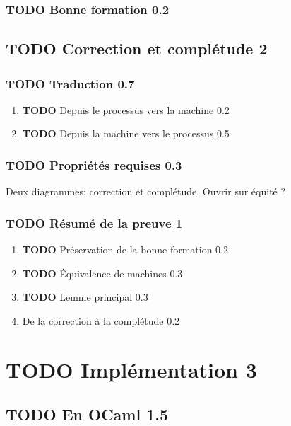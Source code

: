 \documentclass[11pt]{article}
\begin{document}
\subsubsection{{\bfseries\sffamily TODO} Bonne formation 0.2}
\label{sec-3-1-3}
\subsection{{\bfseries\sffamily TODO} Correction et complétude 2}
\label{sec-3-2}
\subsubsection{{\bfseries\sffamily TODO} Traduction 0.7}
\label{sec-3-2-1}
\begin{enumerate}
\item {\bfseries\sffamily TODO} Depuis le processus vers la machine 0.2
\label{sec-3-2-1-1}
\item {\bfseries\sffamily TODO} Depuis la machine vers le processus 0.5
\label{sec-3-2-1-2}
\end{enumerate}
\subsubsection{{\bfseries\sffamily TODO} Propriétés requises 0.3}
\label{sec-3-2-2}
Deux diagrammes: correction et complétude. Ouvrir sur équité ?
\subsubsection{{\bfseries\sffamily TODO} Résumé de la preuve 1}
\label{sec-3-2-3}
\begin{enumerate}
\item {\bfseries\sffamily TODO} Préservation de la bonne formation 0.2
\label{sec-3-2-3-1}
\item {\bfseries\sffamily TODO} Équivalence de machines 0.3
\label{sec-3-2-3-2}
\item {\bfseries\sffamily TODO} Lemme principal 0.3
\label{sec-3-2-3-3}
\item De la correction à la complétude 0.2
\label{sec-3-2-3-4}
\end{enumerate}


\section{{\bfseries\sffamily TODO} Implémentation 3}
\label{sec-4}
\subsection{{\bfseries\sffamily TODO} En OCaml 1.5}
\label{sec-4-1}
\end{document}
